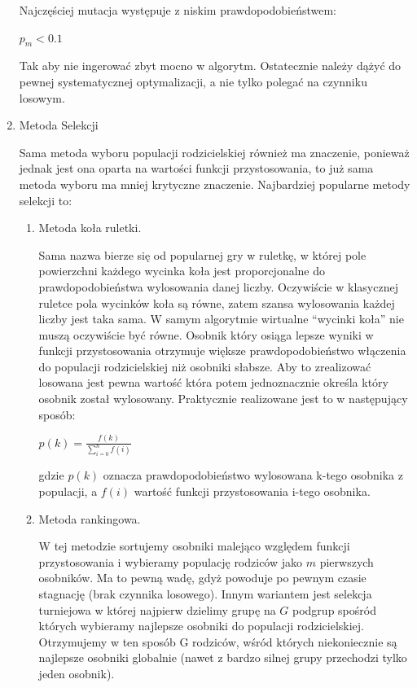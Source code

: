 \begin{par}
\begin{enumerate}
\begin{par}
		Najczęściej mutacja występuje z niskim prawdopodobieństwem:
		\begin{center}
			$p_m < 0.1$
		\end{center}
		Tak aby nie ingerować zbyt mocno w algorytm. Ostatecznie należy dążyć do pewnej systematycznej optymalizacji, a nie tylko polegać na czynniku losowym.
	\end{par}
\item Metoda Selekcji
	\begin{par}
		Sama metoda wyboru populacji rodzicielskiej również ma znaczenie, ponieważ jednak jest ona oparta na wartości funkcji przystosowania, to już sama metoda wyboru ma mniej krytyczne znaczenie.
		Najbardziej popularne metody selekcji to:
		\begin{enumerate}
			\item Metoda koła ruletki.
				\begin{par}
					Sama nazwa bierze się od popularnej gry w ruletkę, w której pole powierzchni każdego wycinka koła jest proporcjonalne do prawdopodobieństwa wylosowania danej liczby. 
					Oczywiście w klasycznej ruletce pola wycinków koła są równe, zatem szansa wylosowania każdej liczby jest taka sama.
					W samym algorytmie wirtualne ``wycinki koła'' nie muszą oczywiście być równe. 
					Osobnik który osiąga lepsze wyniki w funkcji przystosowania otrzymuje większe prawdopodobieństwo włączenia do populacji rodzicielskiej niż osobniki słabsze. 
					Aby to zrealizować losowana jest pewna wartość która potem jednoznacznie określa który osobnik został wylosowany.
					Praktycznie realizowane jest to w następujący sposób:
					\begin{center}
						$p(k)=\frac{f(k)}{\displaystyle\sum\limits_{i=0}^n f(i)}$
					\end{center}
					gdzie $p(k)$ oznacza prawdopodobieństwo wylosowana k-tego osobnika z populacji, a $f(i)$ wartość funkcji przystosowania i-tego osobnika.
				\end{par}
			\item Metoda rankingowa.
				\begin{par}
					W tej metodzie sortujemy osobniki malejąco względem funkcji przystosowania i wybieramy populację rodziców jako $m$ pierwszych osobników. 
					Ma to pewną wadę, gdyż powoduje po pewnym czasie stagnację (brak czynnika losowego). 
					Innym wariantem jest selekcja turniejowa w której najpierw dzielimy grupę na $G$ podgrup spośród których wybieramy najlepsze osobniki do populacji rodzicielskiej. 
					Otrzymujemy w ten sposób G rodziców, wśród których niekoniecznie są najlepsze osobniki globalnie (nawet z bardzo silnej grupy przechodzi tylko jeden osobnik). 

\end{par}
\end{enumerate}
\end{par}
\end{enumerate}
\end{par}
